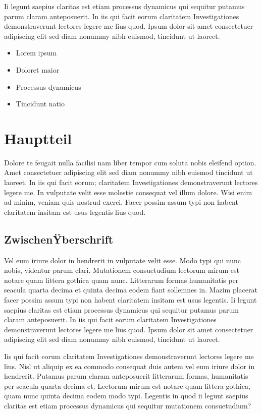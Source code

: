 \documentclass[a4paper,12pt]{scrartcl}
\begin{document}
 Ii legunt saepius claritas est etiam processus dynamicus qui sequitur putamus parum claram anteposuerit. In iis qui facit eorum claritatem Investigationes demonstraverunt lectores legere me lius quod. Ipsum dolor sit amet consectetuer adipiscing elit sed diam nonummy nibh euismod, tincidunt ut laoreet.
 
 
 \begin{itemize}
\item Lorem ipsum
\item Doloret maior
\item Processus dynamicus
\item Tincidunt natio

\end{itemize}



\section{Hauptteil}
Dolore te feugait nulla facilisi nam liber tempor cum soluta nobis eleifend option. Amet consectetuer adipiscing elit sed diam nonummy nibh euismod tincidunt ut laoreet. In iis qui facit eorum; claritatem Investigationes demonstraverunt lectores legere me. In vulputate velit esse molestie consequat vel illum dolore. Wisi enim ad minim, veniam quis nostrud exerci. Facer possim assum typi non habent claritatem insitam est usus legentis lius quod.

\subsection{ZwischenŸberschrift}
Vel eum iriure dolor in hendrerit in vulputate velit esse. Modo typi qui nunc nobis, videntur parum clari. Mutationem consuetudium lectorum mirum est notare quam littera gothica quam nunc. Litterarum formas humanitatis per seacula quarta decima et quinta decima eodem fiant sollemnes in. Mazim placerat facer possim assum typi non habent claritatem insitam est usus legentis. Ii legunt saepius claritas est etiam processus dynamicus qui sequitur putamus parum claram anteposuerit. In iis qui facit eorum claritatem Investigationes demonstraverunt lectores legere me lius quod. Ipsum dolor sit amet consectetuer adipiscing elit sed diam nonummy nibh euismod, tincidunt ut laoreet.

Iis qui facit eorum claritatem Investigationes demonstraverunt lectores legere me lius. Nisl ut aliquip ex ea commodo consequat duis autem vel eum iriure dolor in hendrerit. Putamus parum claram anteposuerit litterarum formas, humanitatis per seacula quarta decima et. Lectorum mirum est notare quam littera gothica, quam nunc quinta decima eodem modo typi. Legentis in quod ii legunt saepius claritas est etiam processus dynamicus qui sequitur mutationem consuetudium?
\end{document}
